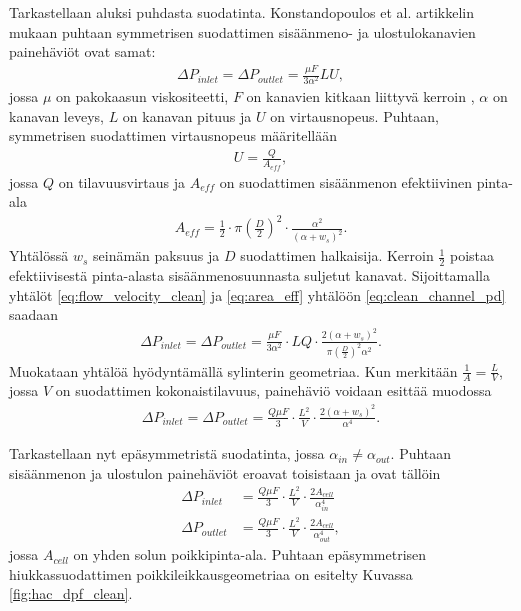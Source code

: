 Tarkastellaan aluksi puhdasta suodatinta.
Konstandopoulos et al. artikkelin mukaan puhtaan symmetrisen suodattimen sisäänmeno- ja ulostulokanavien painehäviöt ovat samat:
\begin{align}\label{eq:clean_channel_pd}
    \Delta P_{inlet} = \Delta P_{outlet} = \frac{\mu F}{3 \alpha^2} LU,
\end{align}
jossa \(\mu \) on pakokaasun viskositeetti, \(F\) on kanavien kitkaan liittyvä kerroin \cite{dieselnet_wall_flow_monolith}, \(\alpha\) on kanavan leveys, \(L\) on kanavan pituus ja \(U\) on virtausnopeus.
Puhtaan, symmetrisen suodattimen virtausnopeus määritellään 
\begin{align}\label{eq:flow_velocity_clean}
    U = \frac{Q}{A_{eff}},
\end{align}
jossa \(Q\) on tilavuusvirtaus ja \(A_{eff}\) on suodattimen sisäänmenon efektiivinen pinta-ala \cite{Konstandopoulos2000}
\begin{align}\label{eq:area_eff}
    A_{eff} = \frac{1}{2}\cdot \pi \left(\frac{D}{2}\right)^2 \cdot \frac{\alpha^2}{(\alpha + w_s)^2}.
\end{align}
Yhtälössä \(w_s\) seinämän paksuus ja \(D \) suodattimen halkaisija.
Kerroin \(\frac{1}{2}\) poistaa efektiivisestä pinta-alasta sisäänmenosuunnasta suljetut kanavat.
Sijoittamalla yhtälöt \eqref{eq:flow_velocity_clean} ja \eqref{eq:area_eff} yhtälöön \eqref{eq:clean_channel_pd} saadaan
\begin{align}
    \Delta P_{inlet} = \Delta P_{outlet}= \frac{\mu F}{3 \alpha^2}\cdot L Q\cdot \frac{2(\alpha + w_s)^2}{\pi \left( \frac{D}{2}\right)^2 \alpha^2}.
\end{align}
Muokataan yhtälöä hyödyntämällä sylinterin geometriaa. Kun merkitään \(\frac{1}{A} = \frac{L}{V}\), jossa \(V\) on suodattimen kokonaistilavuus, painehäviö voidaan esittää muodossa
\begin{align}
    \Delta P_{inlet} = \Delta P_{outlet} =\frac{Q \mu F}{3}\cdot \frac{L^2}{V} \cdot \frac{2(\alpha + w_s)^2}{\alpha^4}.
\end{align}

Tarkastellaan nyt epäsymmetristä suodatinta, jossa \(\alpha_{in} \neq \alpha_{out}\).
Puhtaan sisäänmenon ja ulostulon painehäviöt eroavat toisistaan ja ovat tällöin
\begin{align}
    \Delta P_{inlet} &=\frac{Q \mu F}{3}\cdot \frac{L^2}{V} \cdot \frac{2A_{cell}}{\alpha_{in}^4}
 \\ \Delta P_{outlet} &=\frac{Q \mu F}{3}\cdot \frac{L^2}{V} \cdot \frac{2A_{cell}}{\alpha_{out}^4},
\end{align}
jossa \(A_{cell}\) on yhden solun poikkipinta-ala. Puhtaan epäsymmetrisen hiukkassuodattimen poikkileikkausgeometriaa on esitelty Kuvassa \ref{fig:hac_dpf_clean}.

